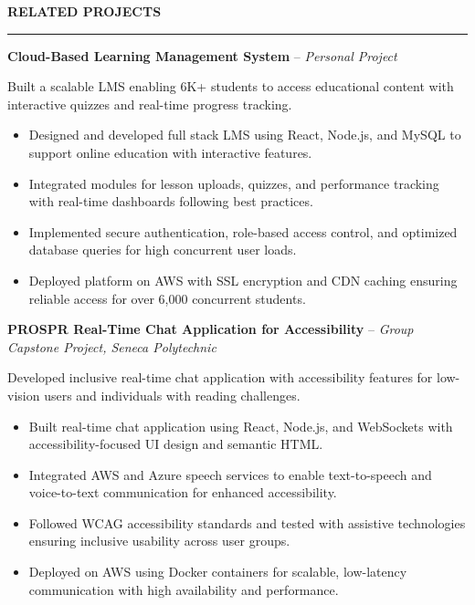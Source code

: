 \documentclass[10pt,letterpaper]{article}
\begin{document}
\vspace{6pt}

\textbf{RELATED PROJECTS}\\[-8pt]
\noindent\rule{\textwidth}{1pt}

\vspace{-2pt}

\textbf{Cloud-Based Learning Management System} -- \emph{Personal Project}

\vspace{-1pt}

Built a scalable LMS enabling 6K+ students to access educational content with interactive quizzes and real-time progress tracking.
\vspace{-1pt}
\begin{itemize}
\item Designed and developed full stack LMS using React, Node.js, and MySQL to support online education with interactive features.
\item Integrated modules for lesson uploads, quizzes, and performance tracking with real-time dashboards following best practices.
\item Implemented secure authentication, role-based access control, and optimized database queries for high concurrent user loads.
\item Deployed platform on AWS with SSL encryption and CDN caching ensuring reliable access for over 6,000 concurrent students.
\end{itemize}

\textbf{PROSPR  Real-Time Chat Application for Accessibility} -- \emph{Group Capstone Project, Seneca Polytechnic}

\vspace{-1pt}

Developed inclusive real-time chat application with accessibility features for low-vision users and individuals with reading challenges.
\vspace{-1pt}
\begin{itemize}
\item Built real-time chat application using React, Node.js, and WebSockets with accessibility-focused UI design and semantic HTML.
\item Integrated AWS and Azure speech services to enable text-to-speech and voice-to-text communication for enhanced accessibility.
\item Followed WCAG accessibility standards and tested with assistive technologies ensuring inclusive usability across user groups.
\item Deployed on AWS using Docker containers for scalable, low-latency communication with high availability and performance.
\end{itemize}
\end{document}
